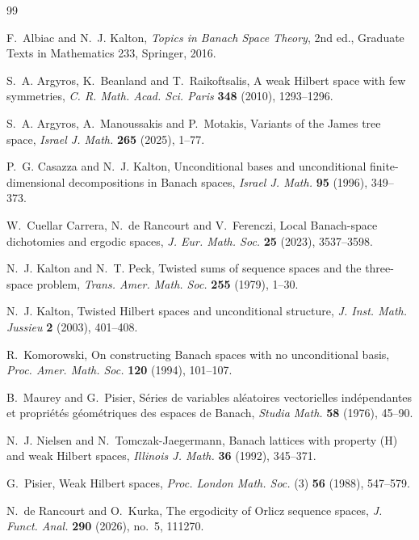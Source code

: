 \documentclass[11pt]{article}
\theoremstyle{definition}
\begin{document}
\begin{thebibliography}{99}

F.~Albiac and N.~J. Kalton,
\emph{Topics in Banach Space Theory}, 2nd ed., Graduate Texts in Mathematics
233, Springer, 2016.

S.~A. Argyros, K.~Beanland and T.~Raikoftsalis,
A weak Hilbert space with few symmetries,
\emph{C. R. Math. Acad. Sci. Paris} \textbf{348} (2010), 1293--1296.

S.~A. Argyros, A.~Manoussakis and P.~Motakis,
Variants of the James tree space,
\emph{Israel J. Math.} \textbf{265} (2025), 1--77.

P.~G. Casazza and N.~J. Kalton,
Unconditional bases and unconditional finite-dimensional decompositions in
Banach spaces,
\emph{Israel J. Math.} \textbf{95} (1996), 349--373.

W.~Cuellar Carrera, N.~de Rancourt and V.~Ferenczi,
Local Banach-space dichotomies and ergodic spaces,
\emph{J. Eur. Math. Soc.} \textbf{25} (2023), 3537--3598.

N.~J. Kalton and N.~T. Peck,
Twisted sums of sequence spaces and the three-space problem,
\emph{Trans. Amer. Math. Soc.} \textbf{255} (1979), 1--30.

N.~J. Kalton,
Twisted Hilbert spaces and unconditional structure,
\emph{J. Inst. Math. Jussieu} \textbf{2} (2003), 401--408.

R.~Komorowski,
On constructing Banach spaces with no unconditional basis,
\emph{Proc. Amer. Math. Soc.} \textbf{120} (1994), 101--107.

B.~Maurey and G.~Pisier,
S\'eries de variables al\'eatoires vectorielles ind\'ependantes et propri\'et\'es
g\'eom\'etriques des espaces de Banach,
\emph{Studia Math.} \textbf{58} (1976), 45--90.

N.~J. Nielsen and N.~Tomczak-Jaegermann,
Banach lattices with property (H) and weak Hilbert spaces,
\emph{Illinois J. Math.} \textbf{36} (1992), 345--371.

G.~Pisier,
Weak Hilbert spaces,
\emph{Proc. London Math. Soc.} (3) \textbf{56} (1988), 547--579.

N.~de Rancourt and O.~Kurka,
The ergodicity of Orlicz sequence spaces,
\emph{J. Funct. Anal.} \textbf{290} (2026), no.~5, 111270.

\end{thebibliography}
\end{document}
